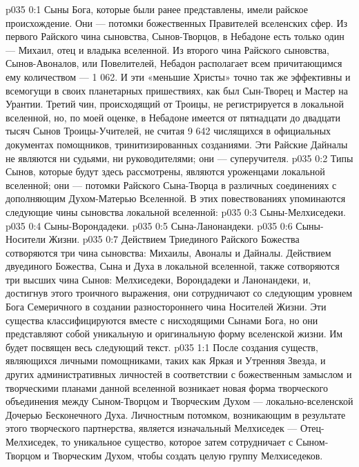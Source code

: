 \author{Глава Архангелов}
\vs p035 0:1 Сыны Бога, которые были ранее представлены, имели райское происхождение. Они --- потомки божественных Правителей вселенских сфер. Из первого Райского чина сыновства, Сынов\hyp{}Творцов, в Небадоне есть только один --- Михаил, отец и владыка вселенной. Из второго чина Райского сыновства, Сынов\hyp{}Авоналов, или Повелителей, Небадон располагает всем причитающимся ему количеством --- 1 062. И эти «меньшие Христы» точно так же эффективны и всемогущи в своих планетарных пришествиях, как был Сын\hyp{}Творец и Мастер на Урантии. Третий чин, происходящий от Троицы, не регистрируется в локальной вселенной, но, по моей оценке, в Небадоне имеется от пятнадцати до двадцати тысяч Сынов Троицы\hyp{}Учителей, не считая 9 642 числящихся в официальных документах помощников, тринитизированных созданиями. Эти Райские Дайналы не являются ни судьями, ни руководителями; они --- суперучителя.
\vs p035 0:2 Типы Сынов, которые будут здесь рассмотрены, являются уроженцами локальной вселенной; они --- потомки Райского Сына\hyp{}Творца в различных соединениях с дополняющим Духом\hyp{}Матерью Вселенной. В этих повествованиях упоминаются следующие чины сыновства локальной вселенной:
\vs p035 0:3 \bibnobreakspace Сыны\hyp{}Мелхиседеки.
\vs p035 0:4 \bibnobreakspace Сыны\hyp{}Ворондадеки.
\vs p035 0:5 \bibnobreakspace Сына\hyp{}Ланонандеки.
\vs p035 0:6 \bibnobreakspace Сыны\hyp{}Носители Жизни.
\vs p035 0:7 \pc Действием Триединого Райского Божества сотворяются три чина сыновства: Михаилы, Авоналы и Дайналы. Действием двуединого Божества, Сына и Духа в локальной вселенной, также сотворяются три высших чина Сынов: Мелхиседеки, Ворондадеки и Ланонандеки, и, достигнув этого троичного выражения, они сотрудничают со следующим уровнем Бога Семеричного в создании разностороннего чина Носителей Жизни. Эти существа классифицируются вместе с нисходящими Сынами Бога, но они представляют собой уникальную и оригинальную форму вселенской жизни. Им будет посвящен весь следующий текст.
\vs p035 1:1 После создания существ, являющихся личными помощниками, таких как Яркая и Утренняя Звезда, и других административных личностей в соответствии с божественным замыслом и творческими планами данной вселенной возникает новая форма творческого объединения между Сыном\hyp{}Творцом и Творческим Духом --- локально\hyp{}вселенской Дочерью Бесконечного Духа. Личностным потомком, возникающим в результате этого творческого партнерства, является изначальный Мелхиседек --- Отец\hyp{}Мелхиседек, то уникальное существо, которое затем сотрудничает с Сыном\hyp{}Творцом и Творческим Духом, чтобы создать целую группу Мелхиседеков.
